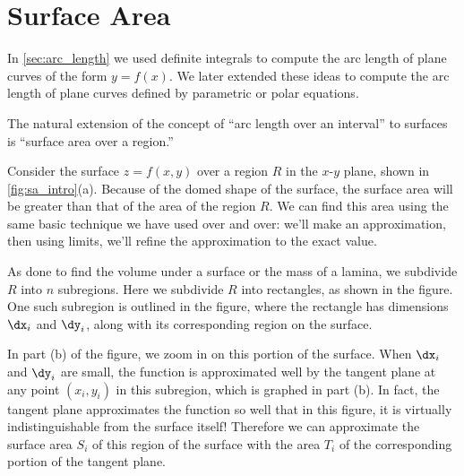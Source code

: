 \section{Surface Area}\label{sec:surface_area}

In \autoref{sec:arc_length} we used definite integrals to compute the arc length of plane curves of the form $y=f(x)$. We later extended these ideas to compute the arc length of plane curves defined by parametric or polar equations. 

The natural extension of the concept of ``arc length over an interval'' to surfaces is ``surface area over a region.'' 

Consider the surface $z=f(x,y)$ over a region $R$ in the $x$-$y$ plane, shown in \autoref{fig:sa_intro}(a). Because of the domed shape of the surface, the surface area will be greater than that of the area of the region $R$. We can find this area using the same basic technique we have used over and over: we'll make an approximation, then using limits, we'll refine the approximation to the exact value.

As done to find the volume under a surface or the mass of a lamina, we subdivide $R$ into $n$ subregions. Here we subdivide $R$ into rectangles, as shown in the figure. One such subregion is outlined in the figure, where the rectangle has dimensions $\dx_i$ and $\dy_i$, along with its corresponding region on the surface.

In part (b) of the figure, we zoom in on this portion of the surface. When $\dx_i$ and $\dy_i$ are small, the function is approximated well by the tangent plane at any point $(x_i,y_i)$ in this subregion, which is graphed in part (b). In fact, the tangent plane approximates the function so well that in this figure, it is virtually indistinguishable from the surface itself! Therefore we can approximate the surface area $S_i$ of this region of the surface with the area $T_i$ of the corresponding portion of the tangent plane.

